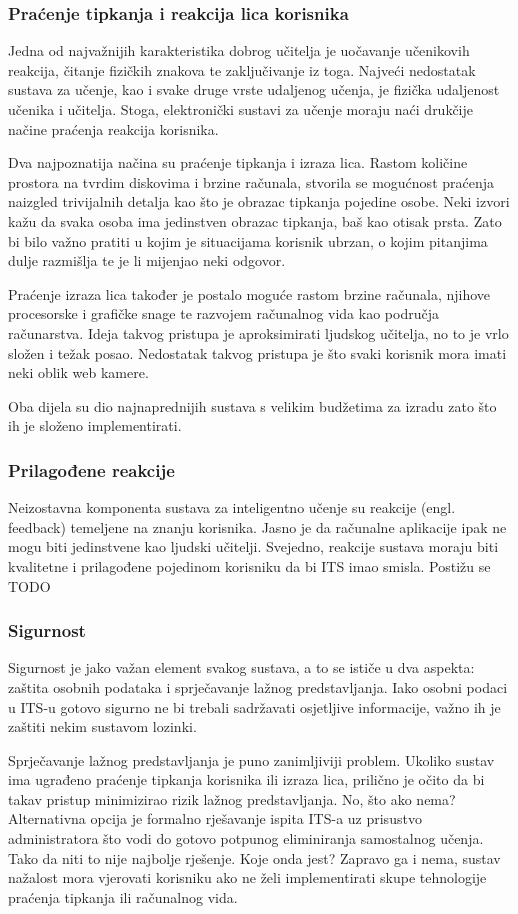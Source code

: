 \documentclass[times, utf8, zavrsni]{fer}
\begin{document}
\subsubsection{Praćenje tipkanja i reakcija lica korisnika}
Jedna od najvažnijih karakteristika dobrog učitelja je uočavanje učenikovih reakcija, čitanje fizičkih znakova te zaključivanje iz toga. Najveći nedostatak sustava za učenje, kao i svake druge vrste udaljenog učenja, je fizička udaljenost učenika i učitelja. Stoga, elektronički sustavi za učenje moraju naći drukčije načine praćenja reakcija korisnika.
\par
Dva najpoznatija načina su praćenje tipkanja i izraza lica. Rastom količine prostora na tvrdim diskovima i brzine računala, stvorila se mogućnost praćenja naizgled trivijalnih detalja kao što je obrazac tipkanja pojedine osobe. Neki izvori kažu da svaka osoba ima jedinstven obrazac tipkanja, baš kao otisak prsta. Zato bi bilo važno pratiti u kojim je situacijama korisnik ubrzan, o kojim pitanjima dulje razmišlja te je li mijenjao neki odgovor.
\par
Praćenje izraza lica također je postalo moguće rastom brzine računala, njihove procesorske i grafičke snage te razvojem računalnog vida kao područja računarstva. Ideja takvog pristupa je aproksimirati ljudskog učitelja, no to je vrlo složen i težak posao. Nedostatak takvog pristupa je što svaki korisnik mora imati neki oblik web kamere.
\par
Oba dijela su dio najnaprednijih sustava s velikim budžetima za izradu zato što ih je složeno implementirati. 

\subsubsection{Prilagođene reakcije}
Neizostavna komponenta sustava za inteligentno učenje su reakcije (engl. feedback) temeljene na znanju korisnika. Jasno je da računalne aplikacije ipak ne mogu biti jedinstvene kao ljudski učitelji. Svejedno, reakcije sustava moraju biti kvalitetne i prilagođene pojedinom korisniku da bi ITS imao smisla. Postižu se 
TODO

\subsubsection{Sigurnost}
Sigurnost je jako važan element svakog sustava, a to se ističe u dva aspekta: zaštita osobnih podataka i sprječavanje lažnog predstavljanja. Iako osobni podaci u ITS-u gotovo sigurno ne bi trebali sadržavati osjetljive informacije, važno ih je zaštiti nekim sustavom lozinki.
\par
Sprječavanje lažnog predstavljanja je puno zanimljiviji problem. Ukoliko sustav ima ugrađeno praćenje tipkanja korisnika ili izraza lica, prilično je očito da bi takav pristup minimizirao rizik lažnog predstavljanja. No, što ako nema? Alternativna opcija je formalno rješavanje ispita ITS-a uz prisustvo administratora što vodi do gotovo potpunog eliminiranja samostalnog učenja. Tako da niti to nije najbolje rješenje. Koje onda jest? Zapravo ga i nema, sustav nažalost mora vjerovati korisniku ako ne želi implementirati skupe tehnologije praćenja tipkanja ili računalnog vida.
\end{document}
